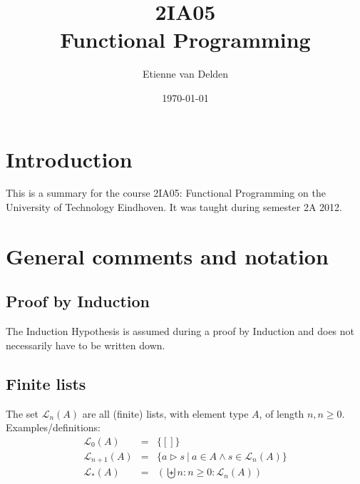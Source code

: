 \documentclass[onesided]{memoir}
\begin{document}
	
	
	\title{2IA05\\ 
        Functional \mbox{Programming}}
	
	\author{Etienne van Delden}
		
	\date{\today}
	
	\maketitle
	
	
	\chapter*{Introduction} \newpage \pagecolor{white}
    This is a summary for the course 2IA05: Functional Programming on the University of Technology Eindhoven. It was taught during semester 2A 2012.
	
	
	
    \chapter{General comments and notation} \newpage \pagecolor{white}
    
    \section{Proof by Induction}
    The Induction Hypothesis is assumed during a proof by Induction and does not necessarily have to be written down. 
    
    \section{Finite lists}
    The set $\mathcal{L}_n(A)$ are all (finite) lists, with element type $A$, of length $n,n \geq 0$. Examples/definitions:
    \begin{displaymath}
    \begin{array}{lcl}
        \mathcal{L}_0(A)     & = & \{[]\} \\
        \mathcal{L}_{n+1}(A) & = & \{ a \triangleright s~|~a \in A \land s \in \mathcal{L}_n(A) \} \\
        \mathcal{L}_*(A)     & = & (\biguplus n : n \geq 0: \mathcal{L}_n(A))
    \end{array}
    \end{displaymath}
       
\end{document}
